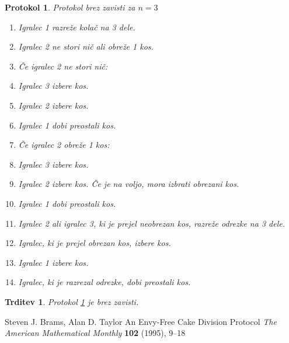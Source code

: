 \documentclass[a4paper, 12pt]{article}
\newtheorem{trditev}{Trditev}
\newtheorem{protokol}{Protokol}
\begin{document}
	\begin{protokol}
		\label{brez_zavisti}
		Protokol brez zavisti za $n = 3$
		\begin{enumerate}
			
			\item Igralec 1 razreže kolač na 3 dele.
			
			\item Igralec 2 ne stori nič ali obreže 1 kos.
			
			\item[] Če igralec 2 ne stori nič:
			
			\item \qquad Igralec 3 izbere kos.
			
			\item \qquad Igralec 2 izbere kos.
			
			\item \qquad Igralec 1 dobi preostali kos.
			
			\item[] Če igralec 2 obreže 1 kos:
			
			\setcounter{enumi}{2}
			
			\item \qquad Igralec 3 izbere kos.
			
			\item \qquad Igralec 2 izbere kos. Če je na voljo, mora izbrati obrezani kos.
			
			\item \qquad Igralec 1 dobi preostali kos.
			
			\item \qquad Igralec 2 ali igralec 3, ki je prejel neobrezan kos, razreže odrezke na 3 dele.
			
			\item \qquad Igralec, ki je prejel obrezan kos, izbere kos.
			
			\item \qquad Igralec 1 izbere kos.
			
			\item \qquad Igralec, ki je razrezal odrezke, dobi preostali kos.
			
		\end{enumerate}
	\end{protokol}
	
	\begin{trditev}
		Protokol \ref{brez_zavisti} je brez zavisti.
	\end{trditev}
	
	\pagebreak
	
	\begin{thebibliography}{5}
		
		Steven J. Brams, Alan D. Taylor
		An Envy-Free Cake Division Protocol
		\textit{The American Mathematical Monthly} \textbf{102} (1995), 9–18
		
	\end{thebibliography}
	
\end{document}
